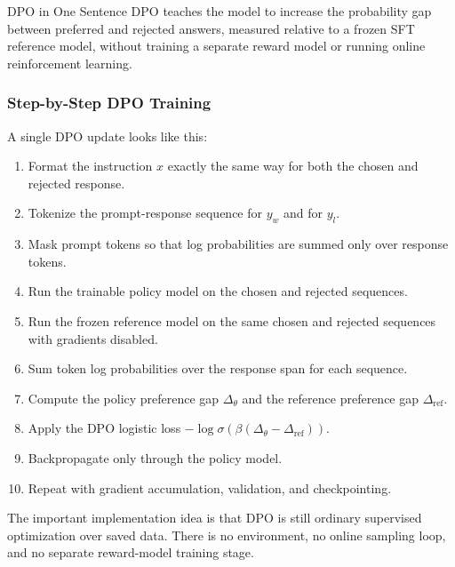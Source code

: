 \documentclass[11pt]{article}
\begin{document}
\begin{infobox}{DPO in One Sentence}
DPO teaches the model to increase the probability gap between preferred and rejected answers, measured relative to a frozen SFT reference model, without training a separate reward model or running online reinforcement learning.
\end{infobox}

\subsubsection{Step-by-Step DPO Training}
A single DPO update looks like this:
\begin{enumerate}[leftmargin=*]
  \item Format the instruction $x$ exactly the same way for both the chosen and rejected response.
  \item Tokenize the prompt-response sequence for $y_w$ and for $y_l$.
  \item Mask prompt tokens so that log probabilities are summed only over response tokens.
  \item Run the trainable policy model on the chosen and rejected sequences.
  \item Run the frozen reference model on the same chosen and rejected sequences with gradients disabled.
  \item Sum token log probabilities over the response span for each sequence.
  \item Compute the policy preference gap $\Delta_\theta$ and the reference preference gap $\Delta_{\mathrm{ref}}$.
  \item Apply the DPO logistic loss $-\log \sigma(\beta(\Delta_\theta-\Delta_{\mathrm{ref}}))$.
  \item Backpropagate only through the policy model.
  \item Repeat with gradient accumulation, validation, and checkpointing.
\end{enumerate}

The important implementation idea is that DPO is still ordinary supervised optimization over saved data. There is no environment, no online sampling loop, and no separate reward-model training stage.
\end{document}
